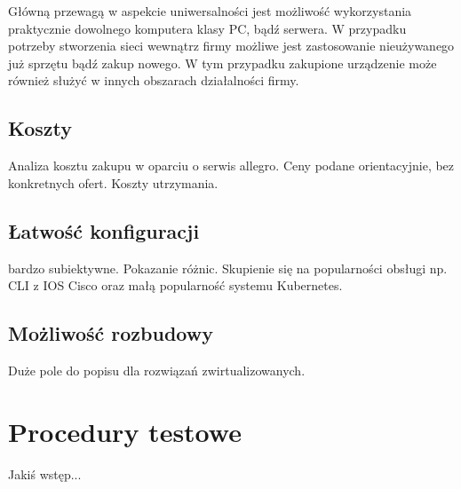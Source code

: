 \documentclass[pl,final,oneside]{mgr} %
\begin{document}
Główną przewagą w aspekcie uniwersalności jest możliwość wykorzystania praktycznie dowolnego komputera klasy PC, bądź serwera. W przypadku potrzeby stworzenia sieci wewnątrz firmy możliwe jest zastosowanie nieużywanego już sprzętu bądź zakup nowego. W tym przypadku zakupione urządzenie może również służyć w innych obszarach działalności firmy.

\section{Koszty}
Analiza kosztu zakupu w oparciu o serwis allegro. Ceny podane orientacyjnie, bez konkretnych ofert.
Koszty utrzymania.



\section{Łatwość konfiguracji}
bardzo subiektywne. Pokazanie różnic. Skupienie się na popularności obsługi np. CLI z IOS Cisco oraz małą popularność systemu Kubernetes.
\section{Możliwość rozbudowy}
Duże pole do popisu dla rozwiązań zwirtualizowanych.

\chapter{Procedury testowe}
Jakiś wstęp...
\end{document}
